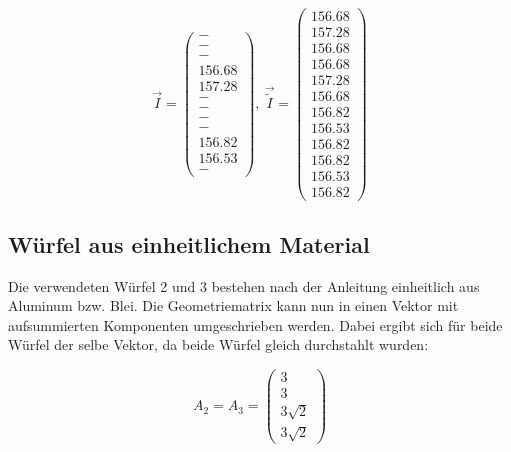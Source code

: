 \begin{equation*}
  \vec{I}=\begin{pmatrix}
        - \\
        - \\
        - \\
        156.68  \\
        157.28  \\
        - \\
        - \\
        - \\
        - \\
        156.82 \\
        156.53 \\
        -
  \end{pmatrix},\
  \vec{\tilde{I}}=\begin{pmatrix}
        156.68 \\
        157.28 \\
        156.68 \\
        156.68 \\
        157.28 \\
        156.68 \\
        156.82 \\
        156.53 \\
        156.82 \\
        156.82 \\
        156.53 \\
        156.82
  \end{pmatrix}
\end{equation*}


\subsection{Würfel aus einheitlichem Material}
Die verwendeten Würfel 2 und 3 bestehen nach der Anleitung einheitlich aus Aluminum bzw.
Blei. Die Geometriematrix kann nun in einen
Vektor mit aufsummierten Komponenten umgeschrieben werden. Dabei ergibt sich für beide
Würfel der selbe Vektor, da beide Würfel gleich durchstahlt wurden:

\begin{equation*}
  A_2 = A_3 = \begin{pmatrix}
          3 \\
          3 \\
          3\sqrt{2} \\
          3\sqrt{2}
        \end{pmatrix}
\end{equation*}

